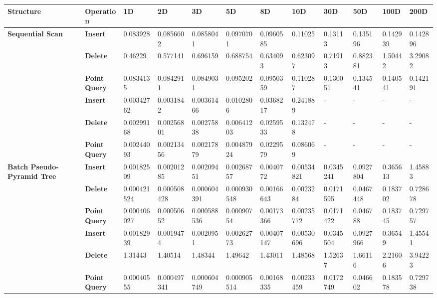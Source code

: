 \begin{landscape}

	\begin{table}
		\centering
		\begin{tabular}{|p{2cm}|l|l|l|l|l|l|l|l|l|l|l|}
			\hline
			\textbf{Structure} & \textbf{Operation} & \textbf{1D} & \textbf{2D} & \textbf{3D} & \textbf{5D} & \textbf{8D} & \textbf{10D} & \textbf{30D} & \textbf{50D} & \textbf{100D} & \textbf{200D} \\
			\hline
			\multirow{ 4}{*}{\textbf{Sequential Scan}} & \textbf{Insert} & 0.083928 & 0.0856602 & 0.0858041 & 0.0970701 & 0.0960585 & 0.11025 & 0.13113 & 0.135196 & 0.142939 & 0.142896 \\ & \textbf{Delete} & 0.46229 & 0.577141 & 0.696159 & 0.688754 & 0.634093 & 0.623097 & 0.71913 & 0.882381 & 1.50442 & 3.29082 \\ & \textbf{Point Query} & 0.0834135 & 0.0842911 & 0.0849031 & 0.095202 & 0.0950359 & 0.110287 & 0.130051 & 0.134541 & 0.140541 & 0.142191 \\
			\hline
			\multirow{ 4}{*}{\textbf{Octree}} & \textbf{Insert} & 0.00342762 & 0.0031842 & 0.00361466 & 0.0102806 & 0.0368217 & 0.241889 & - & - & - & - \\ & \textbf{Delete} & 0.00299168 & 0.00256801 & 0.00275838 & 0.00641203 & 0.0259533 & 0.132478 & - & - & - & - \\ & \textbf{Point Query} & 0.00244093 & 0.00213456 & 0.00217879 & 0.00487924 & 0.0229579 & 0.086069 & - & - & - & - \\
			\hline
			\multirow{ 4}{*}{\textbf{Batch Pseudo-Pyramid Tree}} & \textbf{Insert} & 0.00182509 & 0.00201285 & 0.00209451 & 0.00268757 & 0.0040772 & 0.00534821 & 0.0345241 & 0.0927804 & 0.365613 & 1.45883 \\ & \textbf{Delete} & 0.000421524 & 0.000508428 & 0.000604391 & 0.000930548 & 0.00166643 & 0.0023284 & 0.0171595 & 0.0467448 & 0.183702 & 0.728678 \\ & \textbf{Point Query} & 0.000406027 & 0.00050652 & 0.000588536 & 0.00090754 & 0.00173366 & 0.00235772 & 0.0171422 & 0.046788 & 0.183745 & 0.729757 \\
			\hline
			\multirow{ 4}{*}{\textbf{Defragmented Pseudo-Pyramid Tree}} & \textbf{Insert} & 0.00182939 & 0.0019474 & 0.0020951 & 0.00262773 & 0.00407147 & 0.00530696 & 0.0345504 & 0.0927966 & 0.36549 & 1.45541 \\ & \textbf{Delete} & 1.31443 & 1.40514 & 1.48344 & 1.49642 & 1.43011 & 1.48568 & 1.52637 & 1.66116 & 2.21606 & 3.94223 \\ & \textbf{Point Query} & 0.00040555 & 0.000497341 & 0.000604749 & 0.000905514 & 0.00168335 & 0.00233459 & 0.0172749 & 0.046602 & 0.183578 & 0.729738 \\

\end{tabular}
\end{table}
\end{landscape}
